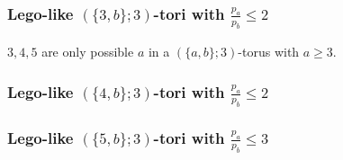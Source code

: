 \documentclass{beamer}
\begin{document}
\begin{frame}\frametitle{Lego-like $(\{3,b\};3)$-tori with $\frac{p_a}{p_b}\le 2$}
\vspace{-1mm}

$3,4,5$ are only possible $a$ in a $(\{a,b\};3)$-torus with $a\ge 3$.

\begin{table}
 \tiny


\end{table}

\end{frame}


\begin{frame}\frametitle{Lego-like $(\{4,b\};3)$-tori with $\frac{p_a}{p_b}\le 2$}
\vspace{-1mm}

\begin{table}
 \tiny


\end{table}

\end{frame}

\begin{frame}\frametitle{Lego-like $(\{5,b\};3)$-tori with $\frac{p_a}{p_b}\le 3$}
\vspace{-1mm}

\begin{table}
 \tiny


\end{table}

\end{frame}
\end{document}
